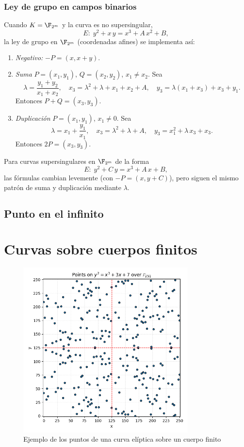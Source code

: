 \subsubsection*{Ley de grupo en campos binarios}

Cuando \(K = \F_{2^m}\) y la curva es no supersingular,
\[
  E\colon\;y^2 + x\,y = x^3 + A\,x^2 + B,
\]
la ley de grupo en \(\F_{2^m}\) (coordenadas afines) se implementa así:

\begin{enumerate}
  \item \emph{Negativo:} \(-P = (x,x+y)\).
  \item \emph{Suma} \(P=(x_1,y_1)\), \(Q=(x_2,y_2)\), \(x_1\neq x_2\). Sea
    \[
      \lambda = \frac{y_1 + y_2}{x_1 + x_2},\quad
      x_3 = \lambda^2 + \lambda + x_1 + x_2 + A,\quad
      y_3 = \lambda(x_1 + x_3) + x_3 + y_1.
    \]
    Entonces \(P + Q = (x_3,y_3)\).
  \item \emph{Duplicación} \(P=(x_1,y_1)\), \(x_1\neq0\). Sea
    \[
      \lambda = x_1 + \frac{y_1}{x_1},\quad
      x_3 = \lambda^2 + \lambda + A,\quad
      y_3 = x_1^2 + \lambda\,x_3 + x_3.
    \]
    Entonces \(2P = (x_3,y_3)\).
\end{enumerate}

Para curvas supersingulares en \(\F_{2^m}\) de la forma
\[
  E\colon\;y^2 + C\,y = x^3 + A\,x + B,
\]
las fórmulas cambian levemente (con \(-P=(x,y+C)\)), pero siguen el mismo patrón de suma y duplicación mediante \(\lambda\).

\subsection{Punto en el infinito}


\section{Curvas sobre cuerpos finitos}\label{sec:curvas_sobre_cuerpos_finitos}
\begin{figure}[H]
    \centering
    \includegraphics[width=0.8\textwidth]{imagenes/points_finite_field_251.png}
    \caption{Ejemplo de los puntos de una curva elíptica sobre un cuerpo finito}
    \label{fig:points_finite_field_251}
\end{figure}

